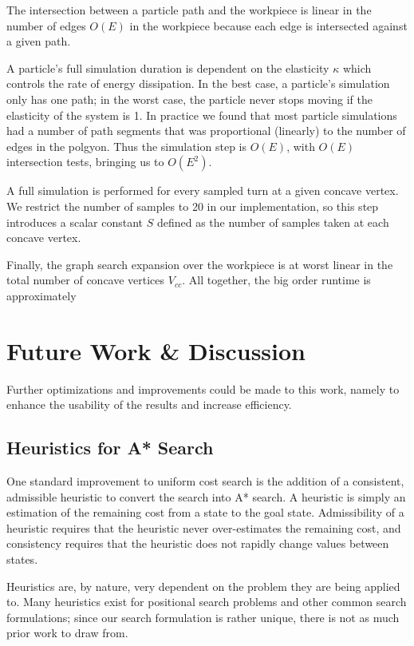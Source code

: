 The intersection between a particle path and the workpiece is linear in the number of edges $O(E)$ in the workpiece because each edge is intersected against a given path.

A particle's full simulation duration is dependent on the elasticity $\kappa$ which controls the rate of energy dissipation. In the best case, a particle's simulation only has one path; in the worst case, the particle never stops moving if the elasticity of the system is 1. In practice we found that most particle simulations had a number of path segments that was proportional (linearly) to the number of edges in the polgyon. Thus the simulation step is $O(E)$, with $O(E)$ intersection tests, bringing us to $O(E^2).$

A full simulation is performed for every sampled turn at a given concave vertex. We restrict the number of samples to 20 in our implementation, so this step introduces a scalar constant $S$ defined as the number of samples taken at each concave vertex.

Finally, the graph search expansion over the workpiece is at worst linear in the total number of concave vertices $V_{cc}$. All together, the big order runtime is approximately

 {
	\label{eq:bigo}
}

\section{Future Work \& Discussion}

Further optimizations and improvements could be made to this work, namely to enhance the usability of the results and increase efficiency.

	\subsection{Heuristics for A* Search}

One standard improvement to uniform cost search is the addition of a consistent, admissible heuristic to convert the search into A* search. A heuristic is simply an estimation of the remaining cost from a state to the goal state. Admissibility of a heuristic requires that the heuristic never over-estimates the remaining cost, and consistency requires that the heuristic does not rapidly change values between states.

Heuristics are, by nature, very dependent on the problem they are being applied to. Many heuristics exist for positional search problems and other common search formulations; since our search formulation is rather unique, there is not as much prior work to draw from.

